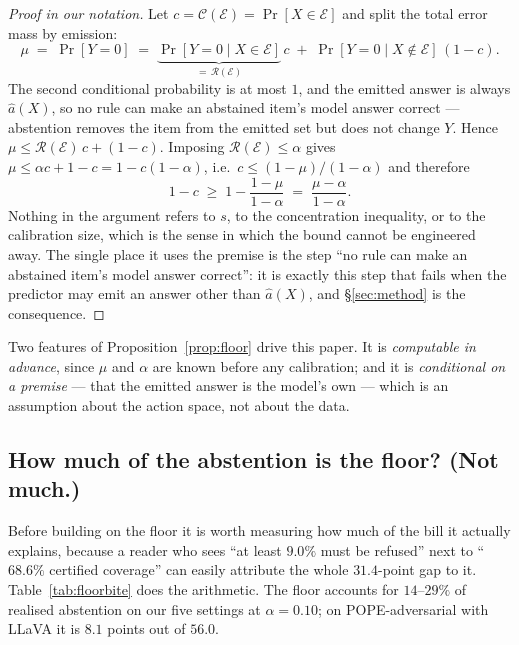 \documentclass[review,number,doubleblind]{elsarticle}
\theoremstyle{plain}
\theoremstyle{definition}
\theoremstyle{remark}
\newcommand{\Risk}{\mathcal{R}}
\newcommand{\Cov}{\mathcal{C}}
\newcommand{\emit}{\mathcal{E}}
\begin{document}
\begin{proof}[Proof in our notation]
Let $c=\Cov(\emit)=\Pr[X\in\emit]$ and split the total error mass by emission:
\[
  \mu \;=\; \Pr[Y=0] \;=\; \underbrace{\Pr[Y=0\mid X\in\emit]}_{=\,\Risk(\emit)}\,c
        \;+\; \Pr[Y=0\mid X\notin\emit]\,(1-c).
\]
The second conditional probability is at most $1$, and the emitted answer is always
$\hat a(X)$, so no rule can make an abstained item's model answer correct --- abstention
removes the item from the emitted set but does not change $Y$. Hence
$\mu\le\Risk(\emit)\,c+(1-c)$. Imposing $\Risk(\emit)\le\alpha$ gives
$\mu\le\alpha c+1-c=1-c(1-\alpha)$, i.e.\ $c\le(1-\mu)/(1-\alpha)$ and therefore
\[
  1-c \;\ge\; 1-\frac{1-\mu}{1-\alpha} \;=\; \frac{\mu-\alpha}{1-\alpha}.
\]
Nothing in the argument refers to $s$, to the concentration inequality, or to the
calibration size, which is the sense in which the bound cannot be engineered away. The
single place it uses the premise is the step ``no rule can make an abstained item's model
answer correct'': it is exactly this step that fails when the predictor may emit an answer
other than $\hat a(X)$, and \S\ref{sec:method} is the consequence.
\end{proof}

Two features of Proposition~\ref{prop:floor} drive this paper. It is \emph{computable in
advance}, since $\mu$ and $\alpha$ are known before any calibration; and it is
\emph{conditional on a premise} --- that the emitted answer is the model's own --- which is
an assumption about the action space, not about the data.

\subsection{How much of the abstention is the floor? (Not much.)}
\label{sec:floorbite}

Before building on the floor it is worth measuring how much of the bill it actually explains,
because a reader who sees ``at least $9.0\%$ must be refused'' next to ``$68.6\%$ certified
coverage'' can easily attribute the whole $31.4$-point gap to it. Table~\ref{tab:floorbite}
does the arithmetic. The floor accounts for $14$--$29\%$ of realised abstention on our five
settings at $\alpha=0.10$; on POPE-adversarial with LLaVA it is $8.1$ points out of $56.0$.
\end{document}
